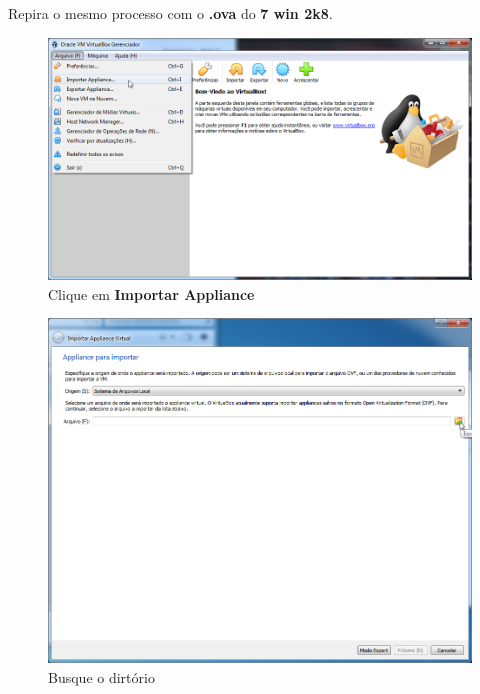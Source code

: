 \documentclass[10pt]{article}
\begin{document}
\par Repira o mesmo processo com o \textbf{.ova} do \textbf{7 win 2k8}.

\begin{figure}[H]
    \centering
    \caption{Clique em \textbf{Importar Appliance}}
    \label{fig:31}
    \includegraphics[width=\linewidth]{images/ativacao_das_maquinas_virtuais/001.png}
\end{figure}
\begin{figure}[H]
    \centering
    \caption{Busque o dirtório}
    \label{fig:32}
    \includegraphics[width=\linewidth]{images/ativacao_das_maquinas_virtuais/002.png}
\end{figure}
\end{document}
